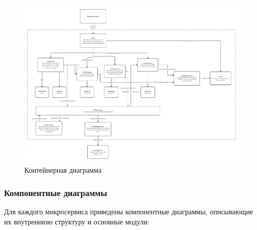 \begin{figure}[H]
        \centering
        \includegraphics[width=0.8\linewidth]{Images/second_chapter_backend_architecture/Picture2.png}
        \caption{Контейнерная диаграмма}
        \label{fig:container-diagram}
\end{figure}

\subsubsection*{Компонентные диаграммы}
Для каждого микросервиса приведены компонентные диаграммы, описывающие их внутреннюю структуру и основные модули:

